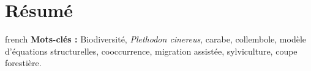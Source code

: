 \chapter*{Résumé}               %
\label{chap-resume}             %

\begin{otherlanguage*}{french}
\textbf{Mots-clés :} Biodiversité, \textit{Plethodon cinereus}, carabe, collembole, modèle d'équations structurelles, cooccurrence, migration assistée, sylviculture, coupe forestière.
\end{otherlanguage*}
